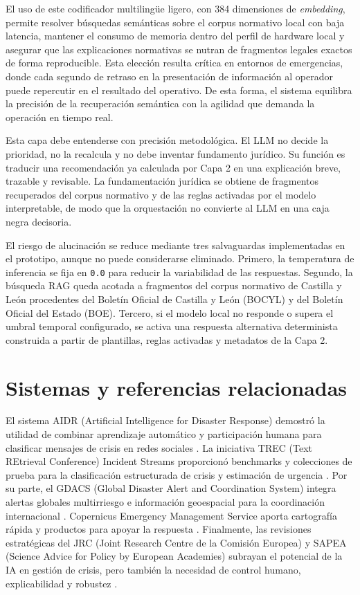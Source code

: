 El uso de este codificador multilingüe ligero, con 384 dimensiones de \textit{embedding}, permite resolver búsquedas semánticas sobre el corpus normativo local con baja latencia, mantener el consumo de memoria dentro del perfil de hardware local y asegurar que las explicaciones normativas se nutran de fragmentos legales exactos de forma reproducible. Esta elección resulta crítica en entornos de emergencias, donde cada segundo de retraso en la presentación de información al operador puede repercutir en el resultado del operativo. De esta forma, el sistema equilibra la precisión de la recuperación semántica con la agilidad que demanda la operación en tiempo real.

Esta capa debe entenderse con precisión metodológica. El LLM no decide la prioridad, no la recalcula y no debe inventar fundamento jurídico. Su función es traducir una recomendación ya calculada por Capa 2 en una explicación breve, trazable y revisable. La fundamentación jurídica se obtiene de fragmentos recuperados del corpus normativo y de las reglas activadas por el modelo interpretable, de modo que la orquestación no convierte al LLM en una caja negra decisoria.

El riesgo de alucinación se reduce mediante tres salvaguardas implementadas en el prototipo, aunque no puede considerarse eliminado. Primero, la temperatura de inferencia se fija en \texttt{0.0} para reducir la variabilidad de las respuestas. Segundo, la búsqueda RAG queda acotada a fragmentos del corpus normativo de Castilla y León procedentes del Boletín Oficial de Castilla y León (BOCYL) y del Boletín Oficial del Estado (BOE). Tercero, si el modelo local no responde o supera el umbral temporal configurado, se activa una respuesta alternativa determinista construida a partir de plantillas, reglas activadas y metadatos de la Capa 2.

\section{Sistemas y referencias relacionadas}

El sistema AIDR (Artificial Intelligence for Disaster Response) demostró la utilidad de combinar aprendizaje automático y participación humana para clasificar mensajes de crisis en redes sociales \cite{Imran2014AIDR}. La iniciativa TREC (Text REtrieval Conference) Incident Streams proporcionó benchmarks y colecciones de prueba para la clasificación estructurada de crisis y estimación de urgencia \cite{TRECIS2021}. Por su parte, el GDACS (Global Disaster Alert and Coordination System) integra alertas globales multirriesgo e información geoespacial para la coordinación internacional \citeyear{GDACS2025}. Copernicus Emergency Management Service aporta cartografía rápida y productos para apoyar la respuesta \cite{CopernicusEMS2025}. Finalmente, las revisiones estratégicas del JRC (Joint Research Centre de la Comisión Europea) y SAPEA (Science Advice for Policy by European Academies) subrayan el potencial de la IA en gestión de crisis, pero también la necesidad de control humano, explicabilidad y robustez \cite{JRC2025AI,SAPEA2025}.

